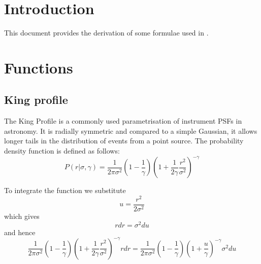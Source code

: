 \documentclass{article}[12pt,a4]
\begin{document}
\frontpage


\section{Introduction}

This document provides the derivation of some formulae used in \this.


\section{Functions}

\subsection{King profile}

The King Profile is a commonly used parametrisation of instrument PSFs in astronomy. 
It is radially symmetric and compared to a simple Gaussian, it allows longer tails in the distribution 
of events from a point source. 
The probability density function is defined as follows:
\begin{equation}
P(r|\sigma, \gamma) = \frac{1}{2 \pi \sigma^2} \left( 1 - \frac{1}{\gamma} \right)
\left( 1 + \frac{1}{2 \gamma} \frac{r^2}{\sigma^2} \right)^{-\gamma}
\end{equation}

To integrate the function we substitute
\begin{equation}
u = \frac{r^2}{2 \sigma^2}
\end{equation}
which gives
\begin{equation}
r dr = \sigma^2 du
\end{equation}
and hence
\begin{equation}
\frac{1}{2 \pi \sigma^2} \left( 1 - \frac{1}{\gamma} \right)
\left( 1 + \frac{1}{2 \gamma} \frac{r^2}{\sigma^2} \right)^{-\gamma} r dr =
\frac{1}{2 \pi \sigma^2} \left( 1 - \frac{1}{\gamma} \right)
\left( 1 + \frac{u}{\gamma} \right)^{-\gamma} \sigma^2 du
\end{equation}
\end{document}
